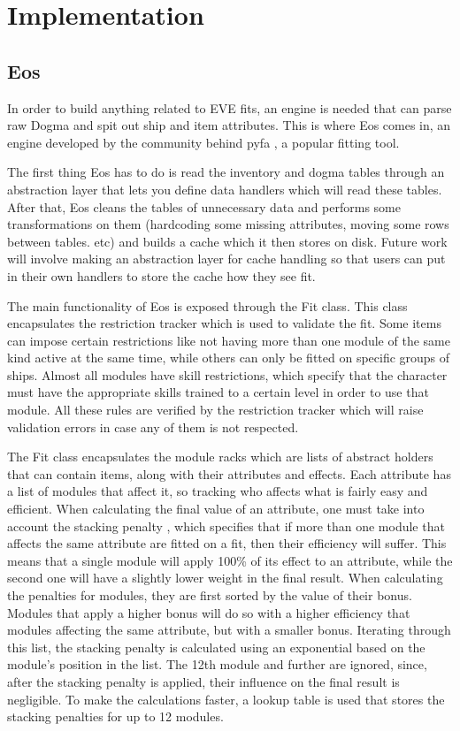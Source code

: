 \chapter{Implementation}
\label{chapter:implementation}

\section{Eos}
In order to build anything related to EVE fits, an engine is needed that can parse raw Dogma and spit out ship and item attributes. This is where Eos comes in, an engine developed by the community behind pyfa \cite{pyfa}, a popular fitting tool.

The first thing Eos has to do is read the inventory and dogma tables through an abstraction layer that lets you define data handlers which will read these tables. After that, Eos cleans the tables of unnecessary data and performs some transformations on them (hardcoding some missing attributes, moving some rows between tables. etc) and builds a cache which it then stores on disk. Future work will involve making an abstraction layer for cache handling so that users can put in their own handlers to store the cache how they see fit.

The main functionality of Eos is exposed through the Fit class. This class encapsulates the restriction tracker which is used to validate the fit. Some items can impose certain restrictions like not having more than one module of the same kind active at the same time, while others can only be fitted on specific groups of ships. Almost all modules have skill restrictions, which specify that the character must have the appropriate skills trained to a certain level in order to use that module. All these rules are verified by the restriction tracker which will raise validation errors in case any of them is not respected.

The Fit class encapsulates the module racks which are lists of abstract holders that can contain items, along with their attributes and effects. Each attribute has a list of modules that affect it, so tracking who affects what is fairly easy and efficient. When calculating the final value of an attribute, one must take into account the stacking penalty \cite{stacking}, which specifies that if more than one module that affects the same attribute are fitted on a fit, then their efficiency will suffer. This means that a single module will apply 100\% of its effect to an attribute, while the second one will have a slightly lower weight in the final result. When calculating the penalties for modules, they are first sorted by the value of their bonus. Modules that apply a higher bonus will do so with a higher efficiency that modules affecting the same attribute, but with a smaller bonus. Iterating through this list, the stacking penalty is calculated using an exponential based on the module’s position in the list. The 12th module and further are ignored, since, after the stacking penalty is applied, their influence on the final result is negligible. To make the calculations faster, a lookup table is used that stores the stacking penalties for up to 12 modules.

